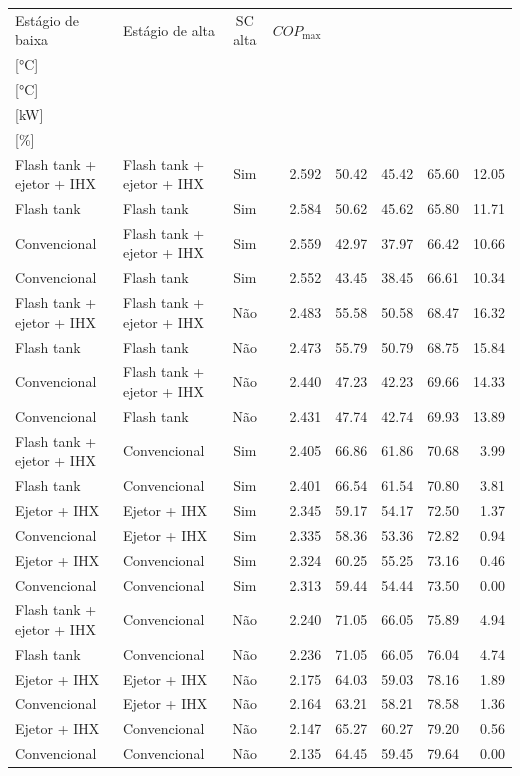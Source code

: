 {\small\setlength{\tabcolsep}{4pt}\renewcommand{\arraystretch}{1.12}
\begin{tabular}{llcrrrrr}
\toprule
Estágio de baixa & Estágio de alta & SC alta & $COP_{\max}$ & \shortstack{$T_{\mathrm{cond,l}}^*$\\{[°C]}} & \shortstack{$T_{\mathrm{evap,h}}^*$\\{[°C]}} & \shortstack{$\dot W_{\mathrm{liq}}$\\{[kW]}} & \shortstack{$\Delta COP_{\mathrm{opt}}$\\{[\%]}} \\
\midrule
Flash tank + ejetor + IHX & Flash tank + ejetor + IHX & Sim & 2.592 & 50.42 & 45.42 & 65.60 & 12.05 \\
Flash tank & Flash tank & Sim & 2.584 & 50.62 & 45.62 & 65.80 & 11.71 \\
Convencional & Flash tank + ejetor + IHX & Sim & 2.559 & 42.97 & 37.97 & 66.42 & 10.66 \\
Convencional & Flash tank & Sim & 2.552 & 43.45 & 38.45 & 66.61 & 10.34 \\
Flash tank + ejetor + IHX & Flash tank + ejetor + IHX & Não & 2.483 & 55.58 & 50.58 & 68.47 & 16.32 \\
Flash tank & Flash tank & Não & 2.473 & 55.79 & 50.79 & 68.75 & 15.84 \\
Convencional & Flash tank + ejetor + IHX & Não & 2.440 & 47.23 & 42.23 & 69.66 & 14.33 \\
Convencional & Flash tank & Não & 2.431 & 47.74 & 42.74 & 69.93 & 13.89 \\
Flash tank + ejetor + IHX & Convencional & Sim & 2.405 & 66.86 & 61.86 & 70.68 & 3.99 \\
Flash tank & Convencional & Sim & 2.401 & 66.54 & 61.54 & 70.80 & 3.81 \\
Ejetor + IHX & Ejetor + IHX & Sim & 2.345 & 59.17 & 54.17 & 72.50 & 1.37 \\
Convencional & Ejetor + IHX & Sim & 2.335 & 58.36 & 53.36 & 72.82 & 0.94 \\
Ejetor + IHX & Convencional & Sim & 2.324 & 60.25 & 55.25 & 73.16 & 0.46 \\
Convencional & Convencional & Sim & 2.313 & 59.44 & 54.44 & 73.50 & 0.00 \\
Flash tank + ejetor + IHX & Convencional & Não & 2.240 & 71.05 & 66.05 & 75.89 & 4.94 \\
Flash tank & Convencional & Não & 2.236 & 71.05 & 66.05 & 76.04 & 4.74 \\
Ejetor + IHX & Ejetor + IHX & Não & 2.175 & 64.03 & 59.03 & 78.16 & 1.89 \\
Convencional & Ejetor + IHX & Não & 2.164 & 63.21 & 58.21 & 78.58 & 1.36 \\
Ejetor + IHX & Convencional & Não & 2.147 & 65.27 & 60.27 & 79.20 & 0.56 \\
Convencional & Convencional & Não & 2.135 & 64.45 & 59.45 & 79.64 & 0.00 \\
\bottomrule
\end{tabular}
}
